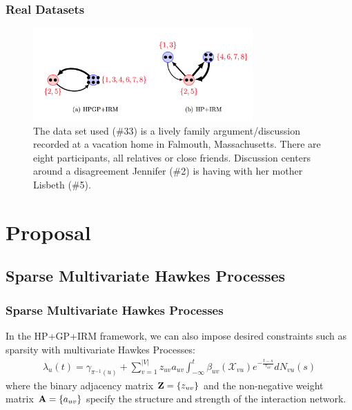 \documentclass{beamer}
\newcommand{\A}{{\bf A}}
\newcommand{\Z}{{\bf Z}}
\newcommand{\XX}{{\mathcal X}}
\begin{document}
\begin{frame}
\frametitle{Real Datasets}
\begin{figure}
  \centering  
	\includegraphics[width=0.75\textwidth]{figures/realdata}
  \caption{The data set used (\#33) is a lively family argument/discussion recorded at a vacation home in Falmouth, Massachusetts. There are eight participants, all relatives or close friends. Discussion centers around a disagreement Jennifer (\#2) is having with her mother Lisbeth (\#5).}
\end{figure}
\end{frame}


\section{Proposal}

\subsection{Sparse Multivariate Hawkes Processes}
\begin{frame}
\frametitle{Sparse Multivariate Hawkes Processes}
In the HP+GP+IRM framework, we can also impose desired constraints such as sparsity with multivariate Hawkes Processes:
\begin{align}
\lambda_u(t) = \gamma_{\pi^{-1}(u)} + \sum_{v=1}^{|V|} z_{uv} a_{uv} \int_{-\infty}^t \beta_{uv}(\XX_{vu}) e^{-\frac{t-s}{\tau_{uv}}} dN_{vu}(s)
\end{align}
where the binary adjacency matrix $\Z = \{z_{uv}\}$ and the non-negative weight matrix $\A = \{a_{uv}\}$ specify the structure and strength of the interaction network.
\end{frame}
\end{document}
